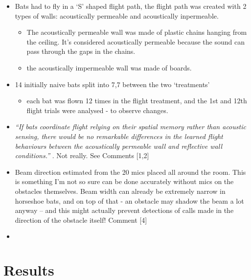 \documentclass[
]{book}
\providecommand{\tightlist}{%
  \setlength{\itemsep}{0pt}\setlength{\parskip}{0pt}}
\begin{document}
\begin{itemize}
\tightlist
\item
  Bats had to fly in a `S' shaped flight path, the flight path was created with 2 types of walls: acoustically permeable and acoustically inpermeable.

  \begin{itemize}
  \tightlist
  \item
    The acoustically permeable wall was made of plastic chains hanging from the ceiling. It's considered acoustically permeable because the sound can pass through the gaps in the chains.
  \item
    the acoustically impermeable wall was made of boards.
  \end{itemize}
\item
  14 initially naive bats split into 7,7 between the two `treatments'

  \begin{itemize}
  \tightlist
  \item
    each bat was flown 12 times in the flight treatment, and the 1st and 12th flight trials were analysed - to observe changes.
  \end{itemize}
\item
  \emph{``If bats coordinate flight relying on their spatial memory rather than acoustic sensing, there would be no remarkable differences in the learned flight behaviours between the acoustically permeable wall and reflective wall conditions.''} . Not really. See Comments {[}1,2{]}
\item
  Beam direction estimated from the 20 mics placed all around the room. This is something I'm not so sure can be done accurately without mics on the obstacles themselves. Beam width can already be extremely narrow in horseshoe bats, and on top of that - an obstacle may shadow the beam a lot anyway -- and this might actually prevent detections of calls made in the direction of the obstacle itself! Comment {[}4{]}
\item
\end{itemize}

\hypertarget{results-12}{%
\section{Results}\label{results-12}}
\end{document}

